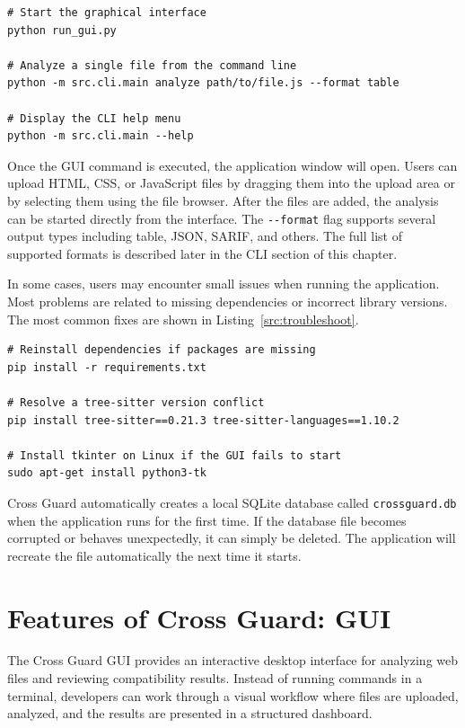 \begin{lstlisting}[caption={Launching Cross Guard and showing CLI help}, label=src:run-app, basicstyle=\ttfamily\small]
# Start the graphical interface
python run_gui.py

# Analyze a single file from the command line
python -m src.cli.main analyze path/to/file.js --format table

# Display the CLI help menu
python -m src.cli.main --help
\end{lstlisting}

Once the GUI command is executed, the application window will open. Users can upload HTML, CSS, or JavaScript files by dragging them into the upload area or by selecting them using the file browser. After the files are added, the analysis can be started directly from the interface. The \texttt{-{}-format} flag supports several output types including table, JSON, SARIF, and others. The full list of supported formats is described later in the CLI section of this chapter.

In some cases, users may encounter small issues when running the application. Most problems are related to missing dependencies or incorrect library versions. The most common fixes are shown in Listing~\ref{src:troubleshoot}.

\begin{lstlisting}[caption={Common troubleshooting commands}, label=src:troubleshoot, basicstyle=\ttfamily\small]
# Reinstall dependencies if packages are missing
pip install -r requirements.txt

# Resolve a tree-sitter version conflict
pip install tree-sitter==0.21.3 tree-sitter-languages==1.10.2

# Install tkinter on Linux if the GUI fails to start
sudo apt-get install python3-tk
\end{lstlisting}

Cross Guard automatically creates a local SQLite database called \texttt{crossguard.db} when the application runs for the first time. If the database file becomes corrupted or behaves unexpectedly, it can simply be deleted. The application will recreate the file automatically the next time it starts.

\section{Features of Cross Guard: GUI}
\label{sec:gui-features}

The Cross Guard GUI provides an interactive desktop interface for analyzing web files and reviewing compatibility results. Instead of running commands in a terminal, developers can work through a visual workflow where files are uploaded, analyzed, and the results are presented in a structured dashboard.

